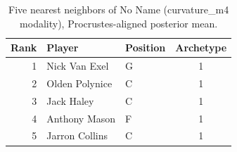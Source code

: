 \begin{table}[htbp]
  \centering\small
  \begin{tabular}{rllc}
    \toprule
    Rank & Player & Position & Archetype \\
    \midrule
    1 & Nick Van Exel & G & 1 \\
    2 & Olden Polynice & C & 1 \\
    3 & Jack Haley & C & 1 \\
    4 & Anthony Mason & F & 1 \\
    5 & Jarron Collins & C & 1 \\
    \bottomrule
  \end{tabular}
  \caption{Five nearest neighbors of No Name (curvature_m4 modality), Procrustes-aligned posterior mean.}
  \label{tab:No_Name_neighbors_curvature_m4}
\end{table}

